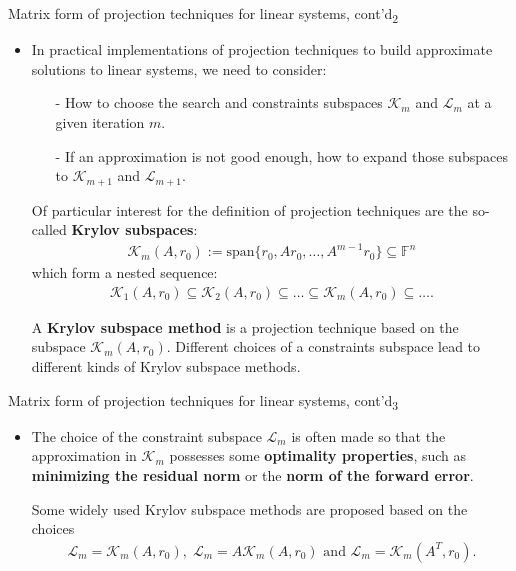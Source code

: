 \documentclass[t,usepdftitle=false]{beamer}
\begin{document}
\begin{frame}{Matrix form of projection techniques for linear systems, cont'd\textsubscript{2}}
\begin{itemize}
\item In practical implementations of projection techniques to build approximate solutions to linear systems, we need to consider:
\begin{itemize}\normalsize
\item[-] How to choose the search and constraints subspaces $\mathcal{K}_m$ and $\mathcal{L}_m$ at a given iteration $m$.
\item[-] If an approximation is not good enough, how to expand those subspaces to  $\mathcal{K}_{m+1}$ and $\mathcal{L}_{m+1}$.
\end{itemize}
\item[] Of particular interest for the definition of projection techniques are the so-called \textbf{Krylov subspaces}:
\begin{align*}
\mathcal{K}_m(A,r_0):=\text{span}\{r_0,Ar_0,\dots,A^{m-1}r_0\}\subseteq\mathbb{F}^n
\end{align*}
which form a nested sequence:
\begin{align*}
\mathcal{K}_1(A,r_0)\subseteq \mathcal{K}_2(A,r_0)\subseteq\dots\subseteq\mathcal{K}_m(A,r_0)\subseteq\dots.
\end{align*}
\item[] A \textbf{Krylov subspace method} is a projection technique based on the subspace $\mathcal{K}_m(A,r_0)$.
Different choices of a constraints subspace lead to different kinds of Krylov subspace methods.
\end{itemize}
\end{frame}

\begin{frame}{Matrix form of projection techniques for linear systems, cont'd\textsubscript{3}}
\begin{itemize}
\item The choice of the constraint subspace $\mathcal{L}_m$ is often made so that the approximation in $\mathcal{K}_m$ possesses some \textbf{optimality properties}, such as \textbf{minimizing the residual norm} or the \textbf{norm of the forward error}.
\item[] Some widely used Krylov subspace methods are proposed based on the choices
\begin{align*}
\mathcal{L}_m=\mathcal{K}_m(A,r_0),\;
\mathcal{L}_m=A\mathcal{K}_m(A,r_0)\text{ and }
\mathcal{L}_m=\mathcal{K}_m(A^T,r_0).
\end{align*}
\end{itemize}
\end{frame}
\end{document}
